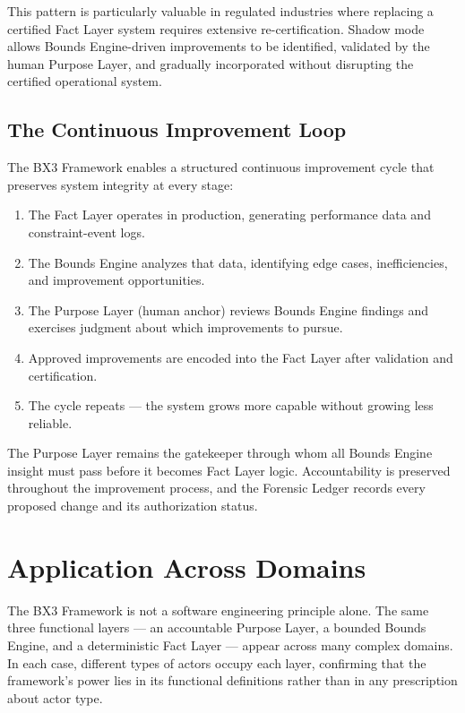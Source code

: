 \documentclass[12pt]{article}
\theoremstyle{plain}
\begin{document}
This pattern is particularly valuable in regulated industries where replacing a certified Fact Layer system requires extensive re-certification. Shadow mode allows Bounds Engine-driven improvements to be identified, validated by the human Purpose Layer, and gradually incorporated without disrupting the certified operational system.

\subsection{The Continuous Improvement Loop}

The BX3 Framework enables a structured continuous improvement cycle that preserves system integrity at every stage:

\begin{enumerate}[noitemsep]
    \item The Fact Layer operates in production, generating performance data and constraint-event logs.
    \item The Bounds Engine analyzes that data, identifying edge cases, inefficiencies, and improvement opportunities.
    \item The Purpose Layer (human anchor) reviews Bounds Engine findings and exercises judgment about which improvements to pursue.
    \item Approved improvements are encoded into the Fact Layer after validation and certification.
    \item The cycle repeats --- the system grows more capable without growing less reliable.
\end{enumerate}

The Purpose Layer remains the gatekeeper through whom all Bounds Engine insight must pass before it becomes Fact Layer logic. Accountability is preserved throughout the improvement process, and the Forensic Ledger records every proposed change and its authorization status.

\section{Application Across Domains}
\label{sec:domains}

The BX3 Framework is not a software engineering principle alone. The same three functional layers --- an accountable Purpose Layer, a bounded Bounds Engine, and a deterministic Fact Layer --- appear across many complex domains. In each case, different types of actors occupy each layer, confirming that the framework's power lies in its functional definitions rather than in any prescription about actor type.
\end{document}
